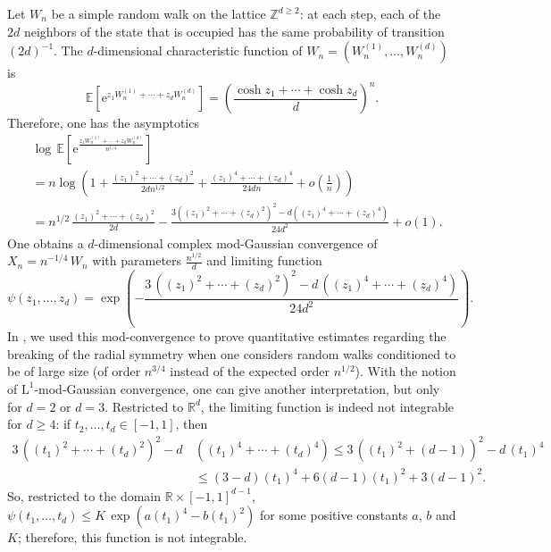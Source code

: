 \documentclass[12pt,a4paper,reqno]{amsart}
\newcommand{\Z}{\mathbb{Z}}
\newcommand{\R}{\mathbb{R}}
\newcommand{\E}{\mathrm{e}}
\newcommand{\esper}{\mathbb{E}}
\theoremstyle{remark}
\begin{document}
Let $W_n$ be a simple random walk on the lattice $\Z^{d\geq 2}$: at each step, each of the $2d$ neighbors of the state that is occupied has the same probability of transition $(2d)^{-1}$. The $d$-dimensional characteristic function of $W_n=(W_n^{(1)},\ldots,W_n^{(d)})$ is
$$\esper[\E^{z_1W_n^{(1)}+\cdots+z_dW_n^{(d)}}]=\left(\frac{\cosh z_1 + \cdots + \cosh z_d}{d}\right)^n.$$
Therefore, one has the asymptotics 
\begin{align*}&\log\,\esper\!\left[\E^{\frac{z_1W_n^{(1)}+\cdots+z_dW_n^{(d)}}{n^{1/4}}}\right]\\
&=n \log\left(1+\frac{(z_1)^2+\cdots+(z_d)^2}{2dn^{1/2}} +\frac{(z_1)^4+\cdots+(z_d)^4}{24dn}+o\left(\frac{1}{n}\right) \right)\\
&=n^{1/2}\,\frac{(z_1)^2+\cdots+(z_d)^2}{2d} -\frac{3((z_1)^2+\cdots+(z_d)^2)^2-d((z_1)^4+\cdots+(z_d)^4)}{24d^2}+o(1).
\end{align*}
One obtains a $d$-dimensional complex mod-Gaussian convergence of $X_n=n^{-1/4}\,W_n$ with parameters $\frac{n^{1/2}}{d}$ and limiting function
$$\psi(z_1,\ldots,z_d)=\exp\left(-\frac{3\,((z_1)^2+\cdots+(z_d)^2)^2-d\,((z_1)^4+\cdots+(z_d)^4)}{24d^2}\right).$$
In \cite{FMN13}, we used this mod-convergence to prove quantitative estimates regarding the breaking of the radial symmetry when one considers random walks conditioned to be of large size (of order $n^{3/4}$ instead of the expected order $n^{1/2}$). With the notion of $\mathrm{L}^1$-mod-Gaussian convergence, one can give another interpretation, but only for $d=2$ or $d=3$. Restricted to $\R^d$, the limiting function is indeed not integrable for $d \geq 4$: if $t_2,\ldots,t_d \in [-1,1]$, then 
\begin{align*}
3\,((t_1)^2+\cdots+(t_d)^2)^2-d\,&((t_1)^4+\cdots+(t_d)^4) \leq 3\,((t_1)^2+(d-1))^2-d\,(t_1)^4\\
&\leq (3-d)(t_1)^4 + 6(d-1)(t_1)^2 + 3(d-1)^2.
\end{align*}
So, restricted to the domain $\R\times [-1,1]^{d-1}$, $\psi(t_1,\ldots,t_d) \leq K\,\exp(a (t_1)^4 - b (t_1)^2)$ for some positive constants $a$, $b$ and $K$; therefore, this function is not integrable.\bigskip
\end{document}
